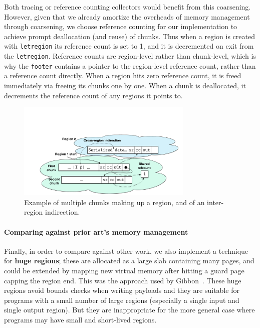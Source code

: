 \documentclass[showabstract,showacknowledgments,showpreface,showdedication]{iuphd}
\theoremstyle{nonumberplain}
\newcommand{\il}[1]{\lstinline[style=inline,mathescape=true];#1;}
\begin{document}
Both tracing or reference counting collectors would benefit from this
coarsening.  However, given that we already amortize the overheads of memory
management through coarsening, we choose reference counting for our
implementation to achieve prompt deallocation (and reuse) of chunks.
%
Thus when a region is created with \il{letregion} its reference count is set to 1,
and it is decremented on exit from the \il{letregion}.
%
Reference counts are region-level rather than chunk-level, which is why the
\il{footer} contains a pointer to the region-level reference count, rather than
a reference count directly.
%
When a region hits zero reference count, it is freed immediately via freeing its
chunks one by one.  When a chunk is deallocated, it decrements the reference
count of any regions it points to.


\begin{figure}
  \vspace{-15mm}
  \begin{center}
    \includegraphics[width=0.75\textwidth]{region-memlayout2}
  \end{center}
  \vspace{-4mm}
  \caption{Example of multiple chunks making up a region, and of an inter-region
    indirection.  \captionscrunch{}}
  \label{fig:regions}
\end{figure}


\paragraph{Comparing against prior art's memory management}
Finally, in order to compare against other work, we also implement a technique
for {\bf huge regions}; these are allocated as a large slab containing many
pages, and could be extended by mapping new virtual memory after hitting a guard
page capping the region end.  This was the approach used by
Gibbon~\cite{ecoop17-gibbon}.
%
These huge regions avoid bounds checks when writing payloads and they are
suitable for programs with a small number of large regions (especially a single
input and single output region).  But they are inappropriate for the more
general case where programs may have small and short-lived regions.
%
\end{document}
